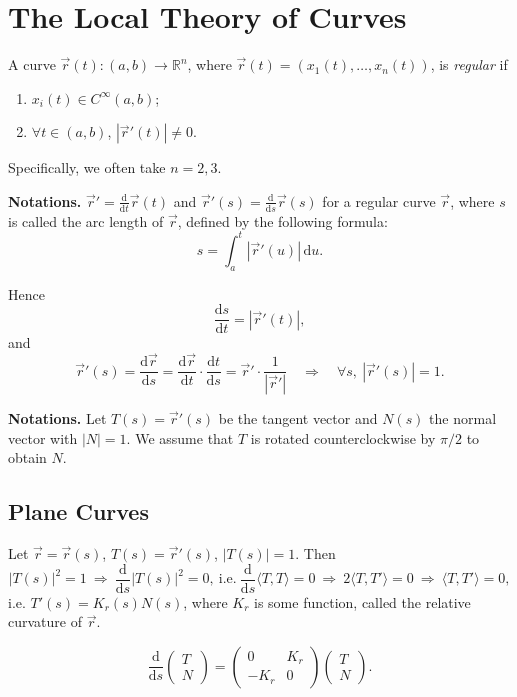 \section{The Local Theory of Curves}

\begin{definition}\label{def:regular-curve}
A curve $\vec r(t)\colon(a,b)\to\mathbb{R}^n$, where $\vec r(t)=(x_1(t),\dots,x_n(t))$, is \emph{regular} if
\begin{enumerate}
  \item $x_i(t)\in C^{\infty}(a,b)$;
  \item $\forall t\in(a,b)$, $|\vec r'(t)|\neq0$.
\end{enumerate}
Specifically, we often take $n=2,3$.
\end{definition}

\noindent\textbf{Notations.} $\vec r'=\frac{\mathrm d}{\mathrm dt}\vec r(t)$ and $\vec r'(s)=\frac{\mathrm d}{\mathrm ds}\vec r(s)$ for a regular curve $\vec r$, where $s$ is called the arc length of $\vec r$, defined by the following formula:
\[
  s=\int_a^t|\vec r'(u)|\,\mathrm du .
\]

Hence
\[
  \frac{\mathrm ds}{\mathrm dt}=|\vec r'(t)|,
\]
and
\[
  \vec r'(s)=\frac{\mathrm d\vec r}{\mathrm ds}
  =\frac{\mathrm d\vec r}{\mathrm dt}\cdot\frac{\mathrm dt}{\mathrm ds}
  =\vec r'\cdot\frac{1}{|\vec r'|}
  \quad\Longrightarrow\quad
  \forall s,\ |\vec r'(s)|=1.
\]

\noindent\textbf{Notations.} Let $T(s)=\vec r'(s)$ be the tangent vector and $N(s)$ the normal vector with $|N|=1$. We assume that $T$ is rotated counterclockwise by $\pi/2$ to obtain $N$.

\subsection{Plane Curves}

Let $\vec r=\vec r(s)$, $T(s)=\vec r'(s)$, $|T(s)|=1$. Then
\[
  |T(s)|^2=1
  \ \Longrightarrow\
  \frac{\mathrm d}{\mathrm ds}|T(s)|^2=0,\ \text{i.e.}\
  \frac{\mathrm d}{\mathrm ds}\langle T,T\rangle=0
  \ \Longrightarrow\
  2\langle T,T'\rangle=0
  \ \Longrightarrow\
  \langle T,T'\rangle=0,
\]
i.e. $T'(s)=K_r(s)N(s)$, where $K_r$ is some function, called the relative curvature of $\vec r$.

\begin{lemma}\label{lem:plane-frenet}
\[
  \frac{\mathrm d}{\mathrm ds}
  \begin{pmatrix}T\\N\end{pmatrix}
  =\begin{pmatrix}0&K_r\\-K_r&0\end{pmatrix}
  \begin{pmatrix}T\\N\end{pmatrix}.
\]
\end{lemma}

